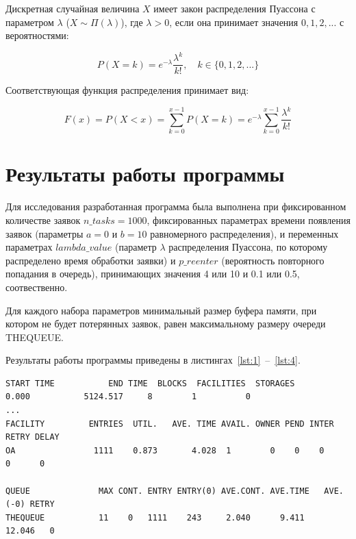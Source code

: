 \documentclass[14pt, a4paper]{extarticle}
\begin{document}
Дискретная случайная величина $X$ имеет закон распределения Пуассона с параметром $\lambda$ ($X \sim \Pi(\lambda)$), где $\lambda > 0$, если она принимает значения $0, 1, 2,...$ с вероятностями:

\begin{equation}
	P(X = k)= e^{-\lambda}\frac{\lambda^{k}}{k!}, \quad k \in \{0, 1, 2, ...\}
\end{equation}

Соответствующая функция распределения принимает вид:

\begin{equation}
	F(x) = P(X < x) = \sum_{k=0}^{x-1}P(X = k) = e^{-\lambda}\sum_{k=0}^{x-1}\frac{\lambda^{k}}{k!} 
\end{equation}




\section{Результаты работы программы}


Для исследования разработанная программа была выполнена при фиксированном количестве заявок $n\_tasks=1000$, фиксированных параметрах времени появления заявок (параметры $a=0$ и $b=10$ равномерного распределения), и переменных параметрах $lambda\_value$ (параметр $\lambda$ распределения Пуассона, по которому распределено время обработки заявки) и $p\_reenter$ (вероятность повторного попадания в очередь), принимающих значения 4 или 10 и 0.1 или 0.5, соотвественно. 

Для каждого набора параметров минимальный размер буфера памяти, при котором не будет потерянных заявок, равен максимальному размеру очереди THEQUEUE.

Результаты работы программы приведены в листингах~\ref{lst:1}~--~\ref{lst:4}.

\begin{lstlisting}[caption = {Результат работы программы при $lambda\_value=4$ и $p\_reenter=0.1$ (максимальный размер очереди -- 11)}, label=lst:1]
START TIME           END TIME  BLOCKS  FACILITIES  STORAGES
0.000           5124.517     8        1          0
...
FACILITY         ENTRIES  UTIL.   AVE. TIME AVAIL. OWNER PEND INTER RETRY DELAY
OA                1111    0.873       4.028  1        0    0    0     0      0

QUEUE              MAX CONT. ENTRY ENTRY(0) AVE.CONT. AVE.TIME   AVE.(-0) RETRY
THEQUEUE           11    0   1111    243     2.040      9.411     12.046   0
\end{lstlisting}
\end{document}
